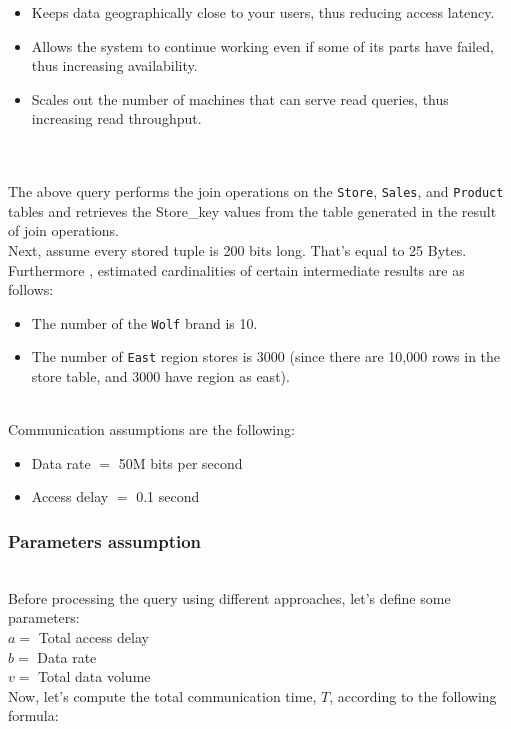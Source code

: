 \begin{itemize}
	\item Keeps data geographically close to your users, thus reducing access latency.
	\item Allows the system to continue working even if some of its parts have failed, thus increasing availability.
	\item Scales out the number of machines that can serve read queries, thus increasing read throughput.
\end{itemize}
\\
\\
The above query performs the join operations on the \texttt{Store}, \texttt{Sales}, and \texttt{Product} tables and retrieves the Store\_key values from the table generated in the result of join operations.
\\
Next, assume every stored tuple is 200 bits long. That's equal to 25 Bytes. Furthermore , estimated cardinalities of certain intermediate results are as follows:

\begin{itemize}
\item
\protect{}\label{JV4c-NXEA7Buhf2BIa1Ia}
The number of the \texttt{Wolf} brand is 10.
\item
\protect{}\label{tovkUEjFcJHYl0iKClv0y}
The number of \texttt{East} region stores is 3000 (since there are 10,000 rows in the store table, and 3000 have region as east).
\end{itemize}
\\
Communication assumptions are the following:

\begin{itemize}
\item
\protect{}\label{tCq3ZX_8wzp8Sn7kZKVW5}
Data rate \protect{}\label{katex_inline_yc4key1mImkGZMuZ1q3IJ}{{{\(=\)}}} 50M bits per second
\item
\protect{}\label{WwUOqkXgVziWti8B0Vbuc}
Access delay \protect{}\label{katex_inline_RUPpsgwLM0tmWecf8-POj}{{{\(=\)}}} 0.1 second
\end{itemize}

\subsubsection{Parameters assumption}\label{RGUVUjZxoLW-EkbEo-u6v}
\\
Before processing the query using different approaches, let's define some parameters:
\\
\protect{}\label{katex_inline_tJIMUN8gwTd1Con09sRTy}{{{\(a =\)}}} Total access delay
\\
\protect{}\label{katex_inline_Ilmaa5HgwNDhXy56PTLUt}{{{\(b=\)}}} Data rate
\\
\protect{}\label{katex_inline_SmlphuImG1oNYGUZsMENJ}{{{\(v =\)}}} Total data volume
\\
Now, let's compute the total communication time, \protect{}\label{katex_inline_uz5SI3ugaA23Eh8AwbMZc}{{{\(T\)}}}, according to the following formula:

